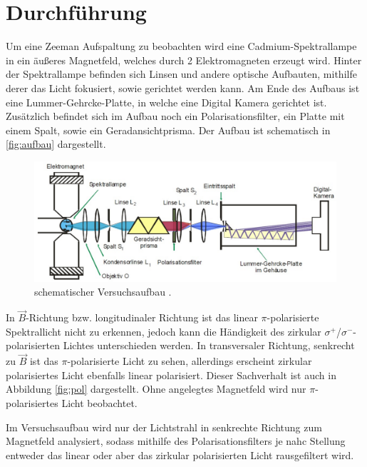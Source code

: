 \section{Durchführung}
\label{sec:durch}
Um eine Zeeman Aufspaltung zu beobachten wird eine Cadmium-Spektrallampe in ein äußeres Magnetfeld, welches durch 2 Elektromagneten erzeugt wird. Hinter der Spektrallampe befinden 
sich Linsen und andere optische Aufbauten, mithilfe derer das Licht fokusiert, sowie gerichtet werden kann. Am Ende des Aufbaus ist eine Lummer-Gehrcke-Platte, in welche eine 
Digital Kamera gerichtet ist. Zusätzlich befindet sich im Aufbau noch ein Polarisationsfilter, ein Platte mit einem Spalt, sowie ein Geradansichtprisma. Der Aufbau ist schematisch in \autoref{fig:aufbau} dargestellt.

\vspace{-5pt}
\begin{figure}[H]
    \centering
    \includegraphics[scale=0.3]{aufbau.png}
    \caption{schematischer Versuchsaufbau \cite{V27}.}
    \label{fig:aufbau}
\end{figure}

\noindent
In $\vec{B}$-Richtung bzw. longitudinaler Richtung ist das linear $\pi$-polarisierte Spektrallicht
nicht zu erkennen, jedoch kann die Händigkeit des zirkular $\sigma^{+}$/$\sigma^{-}$-polarisierten Lichtes
unterschieden werden. In transversaler Richtung, senkrecht zu $\vec{B}$ ist das $\pi$-polarisierte Licht
zu sehen, allerdings erscheint zirkular polarisiertes Licht ebenfalls linear polarisiert.
Dieser Sachverhalt ist auch in Abbildung \ref{fig:pol} dargestellt. Ohne angelegtes Magnetfeld
wird nur $\pi$-polarisiertes Licht beobachtet. 

\noindent
Im Versuchsaufbau wird nur der Lichtstrahl in senkrechte Richtung zum Magnetfeld analysiert, sodass mithilfe des Polarisationsfilters je nahc Stellung entweder das linear oder
aber das zirkular polarisierten Licht rausgefiltert wird.

